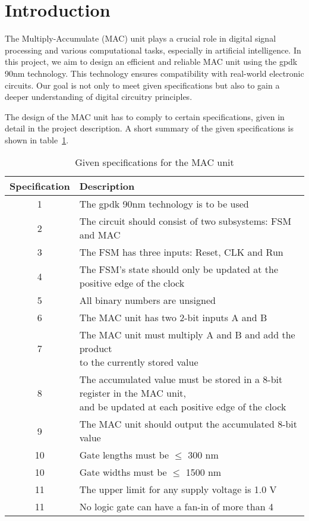 \section{Introduction}
\label{sec:introduction}

The Multiply-Accumulate (MAC) unit plays a crucial role in digital signal processing and various computational tasks, especially in artificial intelligence. In this project, we aim to design an efficient and reliable MAC unit using the gpdk 90nm technology. This technology ensures compatibility with real-world electronic circuits. Our goal is not only to meet given specifications but also to gain a deeper understanding of digital circuitry principles. 

The design of the MAC unit has to comply to certain specifications, given in detail in the project description\cite{project_description}. A short summary of the given specifications is shown in table~\ref{tab:specifications}.

\begin{table}[H]
\caption{Given specifications for the MAC unit}
\label{tab:specifications}
\centering
\begin{tabular}{|c|l|}
\hline
\rowcolor[HTML]{C0C0C0} 
 Specification & Description \\ \hline
 1 & The gpdk 90nm technology is to be used \\ \hline
 2 & The circuit should consist of two subsystems: FSM and MAC \\ \hline
 3 & The FSM has three inputs: Reset, CLK and Run  \\ \hline
 4 & The FSM’s state should only be updated at the positive edge of the clock \\ \hline
 5 & All binary numbers are unsigned \\ \hline
 6 & The MAC unit has two 2-bit inputs A and B \\ \hline
 7 & \makecell[l]{The MAC unit must multiply A and B and add the product\\ to the currently stored value}  \\ \hline
 8 & \makecell[l]{The accumulated value must be stored in a 8-bit register in the MAC unit,\\ and be updated at each positive edge of the clock} \\ \hline
 9 & The MAC unit should output the accumulated 8-bit value \\ \hline
 10 & Gate lengths must be $\le$ 300 nm \\ \hline
 10 & Gate widths must be $\le$ 1500 nm \\ \hline
 11 & The upper limit for any supply voltage is 1.0 V \\ \hline
 11 & No logic gate can have a fan-in of more than 4 \\ \hline
\end{tabular}
\end{table}

